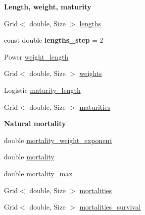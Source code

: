 \begin{Indent}{\bf Length, weight, maturity}\par
\begin{DoxyCompactItemize}
\item 
Grid$<$ double, Size $>$ \hyperlink{classIOSKJ_1_1Model_a9ed62e62883359a97f6233f967988752}{lengths}
\item 
\hypertarget{classIOSKJ_1_1Model_ad74671e3ed2a104a557b75adf0c64b14}{const double {\bfseries lengths\-\_\-step} = 2}\label{classIOSKJ_1_1Model_ad74671e3ed2a104a557b75adf0c64b14}

\item 
Power \hyperlink{classIOSKJ_1_1Model_af6fe777cc3d2e8650b19d93aaea85b04}{weight\-\_\-length}
\item 
Grid$<$ double, Size $>$ \hyperlink{classIOSKJ_1_1Model_adf493cf27e4295cc9cb3dcef50390c06}{weights}
\item 
Logistic \hyperlink{classIOSKJ_1_1Model_aa4dc63b9c8a2263357c7d14af65b8fe6}{maturity\-\_\-length}
\item 
Grid$<$ double, Size $>$ \hyperlink{classIOSKJ_1_1Model_a9a08346e45795f894a4834eb17287e24}{maturities}
\end{DoxyCompactItemize}
\end{Indent}
\begin{Indent}{\bf Natural mortality}\par
\begin{DoxyCompactItemize}
\item 
double \hyperlink{classIOSKJ_1_1Model_a6a3e26a7c2e42634669ea2526626a18e}{mortality\-\_\-weight\-\_\-exponent}
\item 
double \hyperlink{classIOSKJ_1_1Model_a970fad74268a92b08807a7cdbb32468b}{mortality}
\item 
double \hyperlink{classIOSKJ_1_1Model_a7c6726c255509c23749664a82ed4c4a9}{mortality\-\_\-max}
\item 
Grid$<$ double, Size $>$ \hyperlink{classIOSKJ_1_1Model_a44abf17936152f00fa877c4e8ae343dc}{mortalities}
\item 
Grid$<$ double, Size $>$ \hyperlink{classIOSKJ_1_1Model_a3068a8a351456ec886b3176586822d40}{mortalities\-\_\-survival}
\end{DoxyCompactItemize}
\end{Indent}
